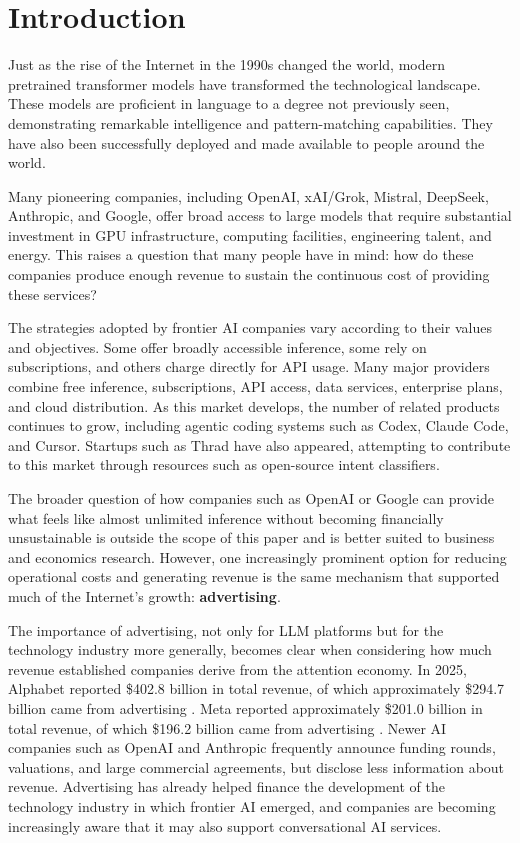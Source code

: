 \documentclass[english]{article}
\begin{document}
\section{Introduction}
\label{sec:introduction}
\color{black}

Just as the rise of the Internet in the 1990s changed the world, modern pretrained
transformer models have transformed the technological landscape. These models are
proficient in language to a degree not previously seen, demonstrating remarkable
intelligence and pattern-matching capabilities. They have also been successfully
deployed and made available to people around the world.

Many pioneering companies, including OpenAI, xAI/Grok, Mistral, DeepSeek,
Anthropic, and Google, offer broad access to large models that require substantial
investment in GPU infrastructure, computing facilities, engineering talent, and
energy. This raises a question that many people have in mind: how do these companies
produce enough revenue to sustain the continuous cost of providing these services?

The strategies adopted by frontier AI companies vary according to their values and
objectives. Some offer broadly accessible inference, some rely on subscriptions,
and others charge directly for API usage. Many major providers combine free
inference, subscriptions, API access, data services, enterprise plans, and cloud
distribution. As this market develops, the number of related products continues to
grow, including agentic coding systems such as Codex, Claude Code, and Cursor.
Startups such as Thrad have also appeared, attempting to contribute to this market
through resources such as open-source intent classifiers.

The broader question of how companies such as OpenAI or Google can provide what
feels like almost unlimited inference without becoming financially unsustainable is
outside the scope of this paper and is better suited to business and economics
research. However, one increasingly prominent option for reducing operational costs
and generating revenue is the same mechanism that supported much of the Internet's
growth: \textbf{advertising}.

The importance of advertising, not only for LLM platforms but for the technology
industry more generally, becomes clear when considering how much revenue established
companies derive from the attention economy. In 2025, Alphabet reported
\$402.8 billion in total revenue, of which approximately \$294.7 billion came from
advertising \cite{alphabet2025annual}. Meta reported approximately \$201.0 billion
in total revenue, of which \$196.2 billion came from advertising
\cite{meta2025results}. Newer AI companies such as OpenAI and Anthropic frequently
announce funding rounds, valuations, and large commercial agreements, but disclose
less information about revenue. Advertising has already helped finance the
development of the technology industry in which frontier AI emerged, and companies
are becoming increasingly aware that it may also support conversational AI
services.
\end{document}

